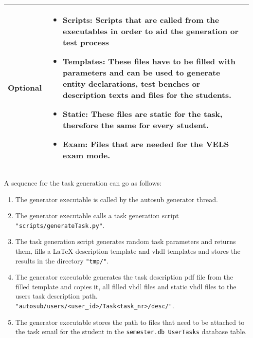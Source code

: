 \begin{tabular}{|p{3cm}|p{10cm}|}
\hline

Optional & \begin{itemize}
    \item {\bf Scripts:} Scripts that are called from the executables in order to aid the 
        generation or test process
    \item {\bf Templates:} These files have to be filled with parameters and can be used to generate entity 
        declarations, test benches or description texts and files for the students.
    \item {\bf Static:} These files are static for the task, therefore the same for every student.
    \item {\bf Exam:} Files that are needed for the VELS exam mode.
\end{itemize} 
\\
\hline
\end{tabular} 


A sequence for the task generation can go as follows:
\begin{enumerate}
    \item The generator executable is called by the autosub generator thread.
    \item The generator executable calls a task generation script
        {\tt "scripts/generateTask.py"}.
    \item The task generation script generates random task parameters and returns
        them, fills a LaTeX description template and vhdl templates and stores
        the results in the directory {\tt "tmp/"}.
    \item The generator executable generates the task description pdf file from the
        filled template and copies it, all filled vhdl files and static vhdl files
        to the users task description path.
        {\tt "autosub/users/<user\_id>/Task<task\_nr>/desc/"}.
    \item The generator executable stores the path to files that need to be attached
        to the task email for the student in the {\tt semester.db UserTasks}
        database table.
\end{enumerate}

